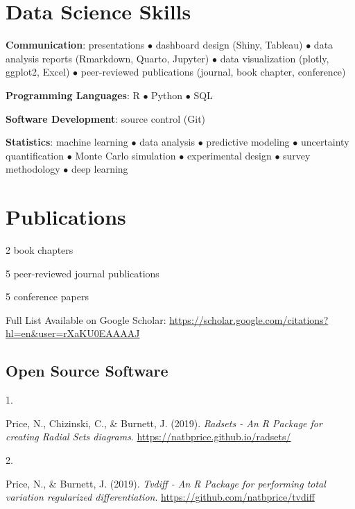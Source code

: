 \documentclass[10pt,a4paper,]{article}
\newlength{\cslhangindent}
\newlength{\csllabelwidth}
\newcommand{\CSLLeftMargin}[1]{\parbox[t]{\csllabelwidth}{\hfill #1~}}
\newcommand{\CSLRightInline}[1]{\parbox[t]{\linewidth - \cslhangindent - \csllabelwidth}{#1}\vspace{0.8ex}}
\begin{document}
\hypertarget{data-science-skills}{%
\section{Data Science Skills}\label{data-science-skills}}

\textbf{Communication}: presentations \(\bullet\) dashboard design
(Shiny, Tableau) \(\bullet\) data analysis reports (Rmarkdown, Quarto,
Jupyter) \(\bullet\) data visualization (plotly, ggplot2, Excel)
\(\bullet\) peer-reviewed publications (journal, book chapter,
conference)

\textbf{Programming Languages}: R \(\bullet\) Python \(\bullet\) SQL

\textbf{Software Development}: source control (Git)

\textbf{Statistics}: machine learning \(\bullet\) data analysis
\(\bullet\) predictive modeling \(\bullet\) uncertainty quantification
\(\bullet\) Monte Carlo simulation \(\bullet\) experimental design
\(\bullet\) survey methodology \(\bullet\) deep learning

\hypertarget{publications}{%
\section{Publications}\label{publications}}

 2 book chapters

 5 peer-reviewed journal publications

 5 conference papers

Full List Available on Google Scholar:
\url{https://scholar.google.com/citations?hl=en\&user=rXaKU0EAAAAJ}

\hypertarget{open-source-software}{%
\subsection{Open Source Software}\label{open-source-software}}

\hypertarget{bibliography}{}
\leavevmode{}%
\CSLLeftMargin{1. }%
\CSLRightInline{Price, N., Chizinski, C., \& Burnett, J. (2019).
\emph{Radsets - An R Package for creating Radial Sets diagrams}.
\url{https://natbprice.github.io/radsets/}}

\leavevmode{}%
\CSLLeftMargin{2. }%
\CSLRightInline{Price, N., \& Burnett, J. (2019). \emph{Tvdiff - An R
Package for performing total variation regularized differentiation}.
\url{https://github.com/natbprice/tvdiff}}
\end{document}
